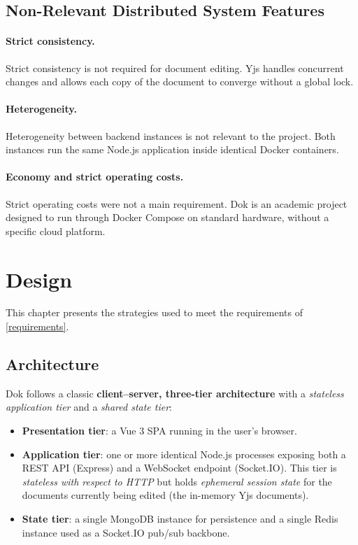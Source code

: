 \documentclass{scrartcl}
\begin{document}
  \subsection{Non-Relevant Distributed System Features}

  \paragraph{Strict consistency.}
  Strict consistency is not required for document editing. Yjs handles concurrent changes
  and allows each copy of the document to converge without a global lock.

  \paragraph{Heterogeneity.}
  Heterogeneity between backend instances is not relevant to the project. Both instances
  run the same Node.js application inside identical Docker containers.

  \paragraph{Economy and strict operating costs.}
  Strict operating costs were not a main requirement. Dok is an academic project designed
  to run through Docker Compose on standard hardware, without a specific cloud platform.



  \section{Design}\label{design}

  This chapter presents the strategies used to meet the requirements of \cref{requirements}.

  \subsection{Architecture}\label{architecture}

  Dok follows a classic \textbf{client--server, three-tier architecture} with a \emph{stateless application tier} and a \emph{shared state tier}:

  \begin{itemize}
    \item \textbf{Presentation tier}: a Vue 3 SPA running in the user's browser.
    \item \textbf{Application tier}: one or more identical Node.js processes exposing both a REST API (Express) and a WebSocket endpoint (Socket.IO). This tier is \emph{stateless with respect to HTTP} but holds \emph{ephemeral session state} for the documents currently being edited (the in-memory Yjs documents).
    \item \textbf{State tier}: a single MongoDB instance for persistence and a single Redis instance used as a Socket.IO pub/sub backbone.
  \end{itemize}
\end{document}
